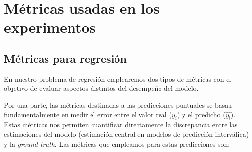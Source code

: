 
\section{Métricas usadas en los experimentos}



\subsection{Métricas para regresión}

En nuestro problema de regresión emplearemos dos tipos de métricas con el objetivo de evaluar aspectos 
distintos del desempeño del modelo.

Por una parte, las métricas destinadas a las predicciones puntuales se basan fundamentalmente en medir el 
error entre el valor real ($y_i$) y el predicho ($\hat{y_i}$). Estas métricas nos permiten cuantificar 
directamente la discrepancia entre las estimaciones del modelo (estimación central en modelos de predicción
interválica) y la \textit{ground truth}. Las métricas que empleamos para estas predicciones son:

